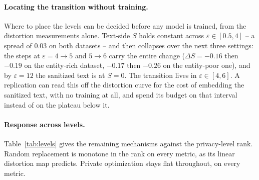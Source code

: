 \paragraph{Locating the transition without training.}
Where to place the levels can be decided before any model is trained,
from the distortion measurements alone.
Text-side $S$ holds constant across $\varepsilon \in [0.5, 4]$ -- a spread of $0.03$ on both datasets -- and then collapses over the next three settings:
the steps at $\varepsilon = 4 \to 5$ and $5 \to 6$ carry the entire change ($\Delta S = -0.16$ then $-0.19$ on the entity-rich dataset, $-0.17$ then $-0.26$ on the entity-poor one),
and by $\varepsilon = 12$ the sanitized text is at $S = 0$. The transition lives in $\varepsilon \in [4, 6]$.
A replication can read this off the distortion curve for the cost of embedding the sanitized text,
with no training at all,
and spend its budget on that interval instead of on the plateau below it.

\paragraph{Response across levels.}
Table~\ref{tab:levels} gives the remaining mechanisms against the privacy-level rank.
Random replacement is monotone in the rank on every metric,
as its linear distortion map predicts.
Private optimization stays flat throughout,
on every metric.

